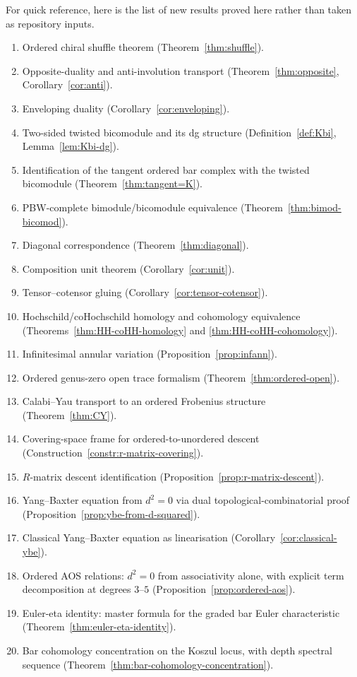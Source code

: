 For quick reference, here is the list of new results proved here rather than taken as repository
inputs.

\begin{enumerate}[label=(\arabic*)]
\item Ordered chiral shuffle theorem (Theorem~\ref{thm:shuffle}).
\item Opposite-duality and anti-involution transport (Theorem~\ref{thm:opposite},
Corollary~\ref{cor:anti}).
\item Enveloping duality (Corollary~\ref{cor:enveloping}).
\item Two-sided twisted bicomodule and its dg structure (Definition~\ref{def:Kbi},
Lemma~\ref{lem:Kbi-dg}).
\item Identification of the tangent ordered bar complex with the twisted bicomodule
(Theorem~\ref{thm:tangent=K}).
\item PBW-complete bimodule/bicomodule equivalence (Theorem~\ref{thm:bimod-bicomod}).
\item Diagonal correspondence (Theorem~\ref{thm:diagonal}).
\item Composition unit theorem (Corollary~\ref{cor:unit}).
\item Tensor--cotensor gluing (Corollary~\ref{cor:tensor-cotensor}).
\item Hochschild/coHochschild homology and cohomology equivalence
(Theorems~\ref{thm:HH-coHH-homology} and \ref{thm:HH-coHH-cohomology}).
\item Infinitesimal annular variation (Proposition~\ref{prop:infann}).
\item Ordered genus-zero open trace formalism (Theorem~\ref{thm:ordered-open}).
\item Calabi--Yau transport to an ordered Frobenius structure (Theorem~\ref{thm:CY}).
\item Covering-space frame for ordered-to-unordered descent
(Construction~\ref{constr:r-matrix-covering}).
\item $R$-matrix descent identification
(Proposition~\ref{prop:r-matrix-descent}).
\item Yang--Baxter equation from $d^2=0$ via dual topological-combinatorial
proof (Proposition~\ref{prop:ybe-from-d-squared}).
\item Classical Yang--Baxter equation as linearisation
(Corollary~\ref{cor:classical-ybe}).
\item Ordered AOS relations: $d^2=0$ from associativity alone, with explicit term
decomposition at degrees $3$--$5$ (Proposition~\ref{prop:ordered-aos}).
\item Euler-eta identity: master formula for the graded bar Euler characteristic
(Theorem~\ref{thm:euler-eta-identity}).
\item Bar cohomology concentration on the Koszul locus, with depth spectral sequence
(Theorem~\ref{thm:bar-cohomology-concentration}).
\end{enumerate}

